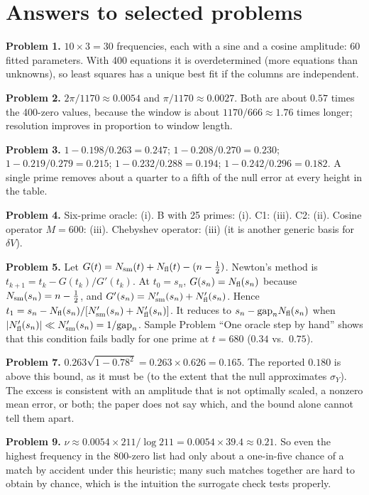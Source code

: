 \section{Answers to selected problems}\label{sec:paper-arithmetic-answers}

\textbf{Problem 1.} $10\times3=30$ frequencies, each with a sine and a cosine amplitude: $60$ fitted parameters. With 400 equations it is overdetermined (more equations than unknowns), so least squares has a unique best fit if the columns are independent.

\textbf{Problem 2.} $2\pi/1170\approx0.0054$ and $\pi/1170\approx0.0027$. Both are about $0.57$ times the 400-zero values, because the window is about $1170/666\approx1.76$ times longer; resolution improves in proportion to window length.

\textbf{Problem 3.} $1-0.198/0.263=0.247$; $1-0.208/0.270=0.230$; $1-0.219/0.279=0.215$; $1-0.232/0.288=0.194$; $1-0.242/0.296=0.182$. A single prime removes about a quarter to a fifth of the null error at every height in the table.

\textbf{Problem 4.} Six-prime oracle: (i). B with 25 primes: (i). C1: (iii). C2: (ii). Cosine operator $M=600$: (iii). Chebyshev operator: (iii) (it is another generic basis for $\delta V$).

\textbf{Problem 5.} Let $G(t)=N_{\mathrm{sm}}(t)+N_{\mathrm{fl}}(t)-(n-\tfrac12)$. Newton's method is $t_{k+1}=t_k-G(t_k)/G'(t_k)$. At $t_0=s_n$, $G(s_n)=N_{\mathrm{fl}}(s_n)$ because $N_{\mathrm{sm}}(s_n)=n-\tfrac12$, and $G'(s_n)=N_{\mathrm{sm}}'(s_n)+N_{\mathrm{fl}}'(s_n)$. Hence $t_1=s_n-N_{\mathrm{fl}}(s_n)/[N_{\mathrm{sm}}'(s_n)+N_{\mathrm{fl}}'(s_n)]$. It reduces to $s_n-\mathrm{gap}_nN_{\mathrm{fl}}(s_n)$ when $|N_{\mathrm{fl}}'(s_n)|\ll N_{\mathrm{sm}}'(s_n)=1/\mathrm{gap}_n$. Sample Problem ``One oracle step by hand'' shows that this condition fails badly for one prime at $t=680$ ($0.34$ vs.\ $0.75$).

\textbf{Problem 7.} $0.263\sqrt{1-0.78^2}=0.263\times0.626=0.165$. The reported $0.180$ is above this bound, as it must be (to the extent that the null approximates $\sigma_Y$). The excess is consistent with an amplitude that is not optimally scaled, a nonzero mean error, or both; the paper does not say which, and the bound alone cannot tell them apart.

\textbf{Problem 9.} $\nu\approx0.0054\times211/\log211=0.0054\times39.4\approx0.21$. So even the highest frequency in the 800-zero list had only about a one-in-five chance of a match by accident under this heuristic; many such matches together are hard to obtain by chance, which is the intuition the surrogate check tests properly.

